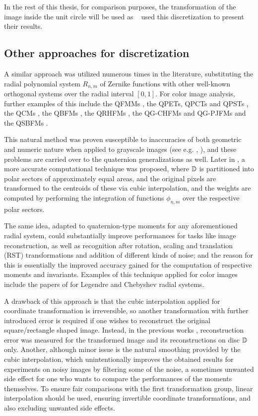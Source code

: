 In the rest of this thesis, for comparison purposes, the transformation of the image inside the unit circle will be used as \citeauthor{qzmi}~\cite{qzmi} used this discretization to present their results.

\subsection{Other approaches for discretization}
A similar approach was utilized numerous times in the literature, substituting the radial polynomial system $R_{n,m}$ of Zernike functions with other well-known orthogonal systems over the radial interval $[0,1]$. For color image analysis, further examples of this include the QFMMs \cite{qfmm}, the QPETs, QPCTs and QPSTs \cite{Li}, the QCMs \cite{Guo}, the QBFMs \cite{Shao}, the QRHFMs \cite{Wang}, the QG-CHFMs and QG-PJFMs \cite{Singh} and the QSBFMs \cite{Yang}.

This natural method was proven susceptible to inaccuracies of both geometric and numeric nature when applied to grayscale images (see e.g.  \cite{LiaoPawlak}, \cite{PawlakLiao}), and these problems are carried over to the quaternion generalizations as well. Later in \cite{Xin}, a more accurate computational technique was proposed, where $\mathbb{D}$ is partitioned into polar sectors of approximately equal areas, and the original pixels are transformed to the centroids of these via cubic interpolation, and the weights are computed by performing the integration of functions $\phi_{n,m}$ over the respective polar sectors.

The same idea, adapted to quaternion-type moments for any aforementioned radial system, could substantially improve performances for tasks like image reconstruction, as well as recognition after rotation, scaling and translation (RST) transformations and addition of different kinds of noise; and the reason for this is essentially the improved accuracy gained for the computation of respective moments and invariants. Examples of this technique applied for color images include the papers of \citeauthor{HosnyLegendre} for Legendre \cite{HosnyLegendre} and Chebyshev \cite{HosnyChebyshev} radial systems.

A drawback of this approach is that the cubic interpolation applied for coordinate transformation is irreversible, so another transformation with further introduced error is required if one wishes to reconstruct the original square/rectangle shaped image. Instead, in the previous works \cite{LiaoPawlak,PawlakLiao,Xin,HosnyLegendre,HosnyChebyshev}, reconstruction error was measured for the transformed image and its reconstructions on disc $\mathbb{D}$ only. Another, although minor issue is the natural smoothing provided by the cubic interpolation, which unintentionally improves the obtained results for experiments on noisy images by filtering some of the noise, a sometimes unwanted side effect for one who wants to compare the performances of the moments themselves. To ensure fair comparisons with the first transformation group, linear interpolation should be used, ensuring invertible coordinate transformations, and also excluding unwanted side effects.

